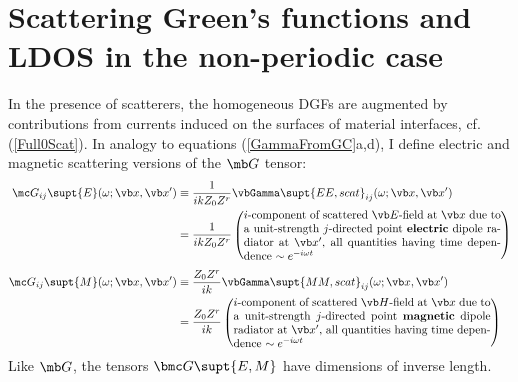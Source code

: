 \documentclass[letterpaper]{article}
\begin{document}
\newpage
\section{Scattering Green's functions and LDOS in the non-periodic case}

In the presence of scatterers, the homogeneous DGFs are augmented
by contributions from currents induced on the surfaces of
material interfaces, cf. (\ref{Full0Scat}). In analogy to equations
(\ref{GammaFromGC}a,d), I define electric and magnetic
scattering versions of the $\mb G$ tensor:
\begin{align*}
 \mc G_{ij}\supt{E}(\omega; \vb x, \vb x^\prime)
 &\equiv
  \frac{1}{ikZ_0 Z^r}\vbGamma\supt{EE,scat}_{ij}(\omega; \vb x, \vb x^\prime) 
\\
 &=\frac{1}{ikZ_0 Z^r}
   \left( \parbox{0.65\textwidth}
    { $i$-component of scattered $\vb E$-field at $\vb x$
      due to a unit-strength $j$-directed point \textbf{electric} 
      dipole radiator
      at $\vb x^\prime$, all quantities having time dependence
      $\sim e^{-i\omega t}$
    }
   \right)
\\[5pt]
 \mc G_{ij}\supt{M}(\omega; \vb x, \vb x^\prime)
  &\equiv
   \frac{Z_0 Z^r}{ik}\vbGamma\supt{MM,scat}_{ij}(\omega; \vb x, \vb x^\prime) 
\\
  &=\frac{Z_0 Z^r}{ik}
   \left( \parbox{0.65\textwidth}
    { $i$-component of scattered $\vb H$-field at $\vb x$
      due to a unit-strength $j$-directed point \textbf{magnetic}
      dipole radiator
      at $\vb x^\prime$, all quantities having time dependence
      $\sim e^{-i\omega t}$
    }
   \right)
\end{align*}
Like $\mb G$, the tensors $\bmc G\supt{E,M}$ have dimensions of inverse
length.
\end{document}

